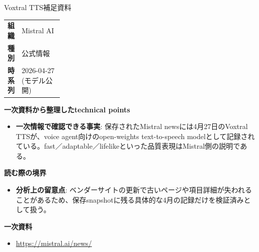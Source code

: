 \begin{technicalnote}{Voxtral TTS}{補足資料}
\begingroup
\begin{tabularx}{\linewidth}{@{}>{\bfseries}p{0.22\linewidth}X@{}}
組織 & Mistral AI \\
種別 & 公式情報 \\
時系列 & 2026-04-27 (モデル公開) \\
\end{tabularx}
\smallskip
{\bfseries 一次資料から整理したtechnical points}
\begin{itemize}[leftmargin=1.5em,itemsep=0.35em]
\item \textbf{一次情報で確認できる事実}: 保存されたMistral newsには4月27日のVoxtral TTSが、voice agent向けのopen-weights text-to-speech modelとして記録されている。fast／adaptable／lifelikeといった品質表現はMistral側の説明である。
\end{itemize}
{\bfseries 読む際の境界}
\begin{itemize}[leftmargin=1.5em,itemsep=0.35em]
\item \textbf{分析上の留意点}: ベンダーサイトの更新で古いページや項目詳細が失われることがあるため、保存snapshotに残る具体的な4月の記録だけを検証済みとして扱う。
\end{itemize}
\begin{samepage}
{\bfseries 一次資料}
\begingroup\sloppy
\begin{itemize}[leftmargin=1.5em,itemsep=0.25em]
\item {\scriptsize\url{https://mistral.ai/news/}}
\end{itemize}
\endgroup
\end{samepage}
\endgroup
\end{technicalnote}
\medskip

